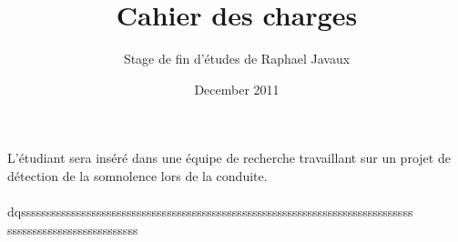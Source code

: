 \documentclass[a4paper,12pt]{report}
\title{Cahier des charges}
\author{Stage de fin d'études de Raphael Javaux}
\date{December 2011}
\begin{document}
\maketitle 
\newpage

\tableofcontents

\paragraph{}
L'étudiant sera inséré dans une équipe de recherche travaillant sur un projet
de détection de la somnolence lors de la conduite.

\paragraph{}
dqssssssssssssssssssssssssssssssssssssssssssssssssssssssssssssssssssssssssssssss
ssssssssssssssssssssssssss
\end{document}
